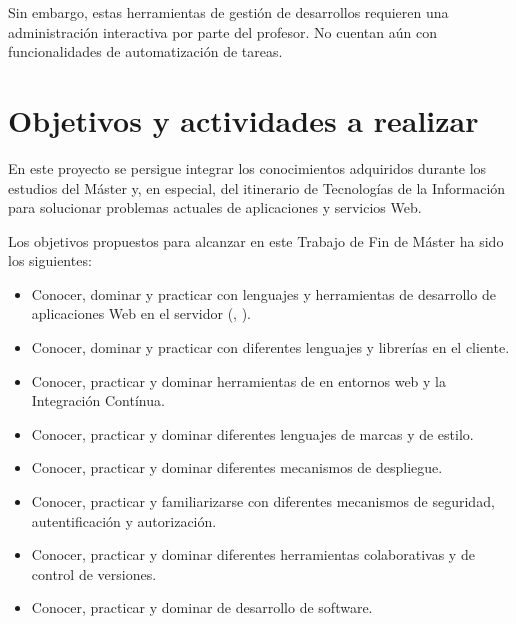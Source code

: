 Sin embargo, estas herramientas de gestión de desarrollos requieren una administración interactiva por parte del profesor. No cuentan aún con funcionalidades de automatización de tareas.

\section{Objetivos y actividades a realizar}
\label{1:sec:3}

En este proyecto se persigue integrar los conocimientos adquiridos durante los estudios del Máster y,
en especial, del itinerario de Tecnologías de la Información para solucionar problemas actuales de aplicaciones y servicios Web.
\bigskip

Los objetivos propuestos para alcanzar en este Trabajo de Fin de Máster ha sido los siguientes:
\begin{itemize}
  \item Conocer, dominar y practicar con lenguajes y herramientas de desarrollo de aplicaciones Web
en el servidor (\ceis{\ref{apend1:node}}, \ceis{\ref{apend1:npm}}).
  \item Conocer, dominar y practicar con diferentes lenguajes y librerías en el cliente.
  \item Conocer, practicar y dominar herramientas de \ceit{\ref{apend1:tdd}} en entornos web y la Integración Contínua.
  \item Conocer, practicar y dominar diferentes lenguajes de marcas y de estilo.
  \item Conocer, practicar y dominar diferentes mecanismos de despliegue.
  \item Conocer, practicar y familiarizarse con diferentes mecanismos de seguridad, autentificación
y autorización.
  \item Conocer, practicar y dominar diferentes herramientas colaborativas y de control de versiones.
  \item Conocer, practicar y dominar \ceit{\ref{apend1:ma}} de desarrollo de software.
\end{itemize}
\newpage

